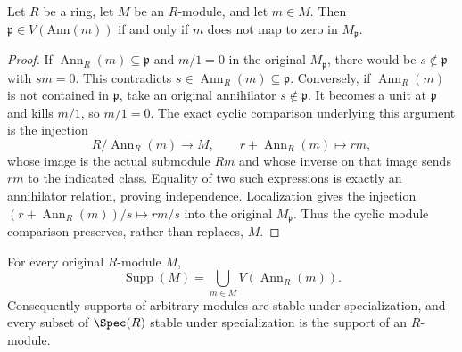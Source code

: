 \begin{lemma}
\label{editorial-source-lemma-support-element}
Let $R$ be a ring, let $M$ be an $R$-module, and let $m \in M$.
Then $\mathfrak p \in V(\text{Ann}(m))$ if and only if
$m$ does not map to zero in $M_\mathfrak p$.
\end{lemma}

\begin{proof}
If $\operatorname{Ann}_R(m)\subseteq\mathfrak p$ and
$m/1=0$ in the original $M_{\mathfrak p}$, there would
be $s\notin\mathfrak p$ with $sm=0$. This contradicts
$s\in\operatorname{Ann}_R(m)\subseteq\mathfrak p$.
Conversely, if $\operatorname{Ann}_R(m)$ is not contained
in $\mathfrak p$, take an original annihilator
$s\notin\mathfrak p$. It becomes a unit at $\mathfrak p$
and kills $m/1$, so $m/1=0$.
The exact cyclic comparison underlying this argument is
the injection
$$
R/\operatorname{Ann}_R(m)\longrightarrow M,\qquad
r+\operatorname{Ann}_R(m)\longmapsto rm,
$$
whose image is the actual submodule $Rm$ and whose
inverse on that image sends $rm$ to the indicated class.
Equality of two such expressions is exactly an
annihilator relation, proving independence. Localization
gives the injection $(r+\operatorname{Ann}_R(m))/s\mapsto rm/s$
into the original $M_{\mathfrak p}$. Thus the cyclic
module comparison preserves, rather than replaces, $M$.
\end{proof}

\begin{lemma}
\label{editorial-source-lemma-support-arbitrary-cyclic-union}
For every original $R$-module $M$,
$$
\operatorname{Supp}(M)=\bigcup_{m\in M}V(\operatorname{Ann}_R(m)).
$$
Consequently supports of arbitrary modules are stable
under specialization, and every subset of $\Spec(R)$
stable under specialization is the support of an $R$-module.
\end{lemma}

